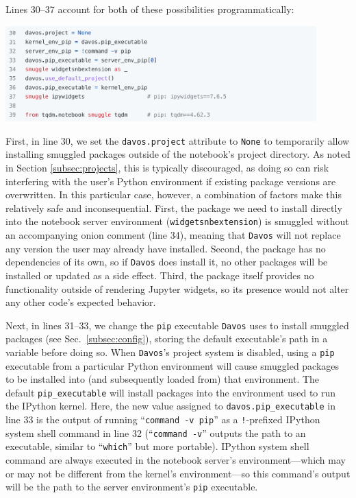 \documentclass[preprint,12pt,a4paper]{elsarticle}
\begin{document}
Lines 30--37 account for both of these possibilities programmatically:
\begin{center}
\includegraphics[width=0.9\textwidth]{figs/example7}
\end{center}
First, in line 30, we set the \texttt{davos.project} attribute to \texttt{None} to temporarily
allow installing smuggled packages outside of the notebook's project directory.
As noted in Section \ref{subsec:projects}, this is typically discouraged, as doing so can risk interfering with the user's Python environment if existing package versions are overwritten.
In this particular case, however, a combination of factors make this relatively safe and inconsequential.
First, the package we need to install directly into the notebook server environment (\texttt{widgetsnbextension}) is smuggled without an accompanying onion comment (line 34), meaning that \texttt{Davos} will not replace any version the user may already have installed.
Second, the package has no dependencies of its own, so if \texttt{Davos} does install it, no other packages will be installed or updated as a side effect.
Third, the package itself provides no functionality outside of rendering Jupyter widgets, so its presence would not alter any other code's expected behavior.

Next, in lines 31--33, we change the \texttt{pip} executable \texttt{Davos} uses to install smuggled packages (see Sec.~\ref{subsec:config}), storing the default executable's path in a variable before doing so.
When \texttt{Davos}'s project system is disabled, using a \texttt{pip} executable from a particular Python environment will cause smuggled packages to be installed into (and subsequently loaded from) that environment.
The default \texttt{pip\_executable} will install packages into the environment used to run the IPython kernel.
Here, the new value assigned to \texttt{davos.pip\_executable} in line 33 is the output of running ``\texttt{command -v pip}'' as a \mbox{\texttt{!}-prefixed} IPython system shell command in line 32 (``\texttt{command -v}'' outputs the path to an executable, similar to ``\texttt{which}'' but more portable).
IPython system shell command are always executed in the notebook server's environment---which may or may not be different from the kernel's environment---so this command's output will be the path to the server environment's \texttt{pip} executable.
\end{document}
